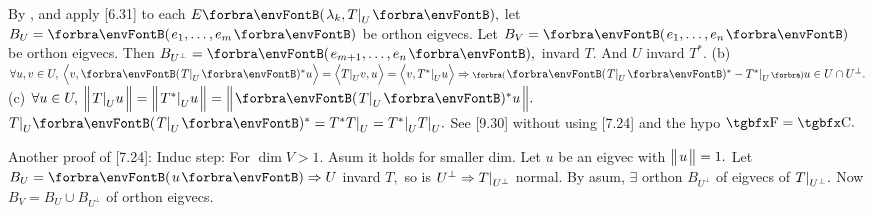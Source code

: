 By , and apply [6.31] to each $E\Par{\lambda_k,T\mmid_U},$ let $B_U=\Par{e_1,\dots,e_m}$ be orthon eigvecs.\parSol{}
Let $B_V=\Par{e_1,\dots,e_n}$ be orthon eigvecs. Then $B_{U^\perp}=\Par{e_{m+1},\dots,e_n},$ invard $T.$ And $U$ invard $T^*.$\parSol{}
(b) $\forall u,v\in U,\:\BigAng{v,\Par{T\mmid_U}{^*}u}=\BigAng{T\mmid_U v,u}=\BigAng{v,T^*\mmid_U u}\Rightarrow\BigPar{\Par{T\mmid_U}{^*}-T^*\mmid_U}u\in U\cap U^\perp.$\vspace{2pt}\parSol{}
(c) $\forall u\in U,\:\BigDvert{T\mmid_U u}=\BigDvert{T^*\mmid_U u}=\BigDvert{\Par{T\mmid_U}{^*}u}.$ \;\Or $T\mmid_U\Par{T\mmid_U}{^*}=T^*T\mmid_U=T^*\mmid_UT\mmid_U.$\PfEnd\vspace{4pt}
\AComm See [9.30] without using [7.24] and the hypo $\Fbb=\Cbb.$\par
{}\ANote Another proof of [7.24]: Induc step: For $\dim V>1.$ Asum it holds for smaller dim.\parNot
Let $u$ be an eigvec with $\big\Vert\hspace{1pt}{}u{}\hspace{1pt}\big\Vert=1.$ Let $B_U=\Par{u}\Rightarrow U$ invard $T,$ so is $U^\perp\Rightarrow T\text{\normalsize|}_{U^\perp}$ normal.\parNot
By asum, $\exists$ orthon $B_{U^\perp}$ of eigvecs of $T\text{\normalsize|}_{U^\perp}.$ Now $B_V=B_U\cup B_{U^\perp}$ of orthon eigvecs.\PfEnd
\SepLine
\ChEnd

